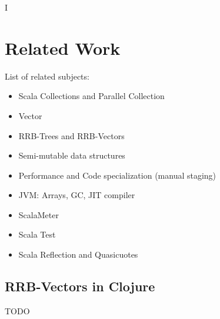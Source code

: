 I%

\chapter{Related Work} %

\label{RelatedWork} %



List of related subjects:
\begin{itemize}
  \item Scala Collections and Parallel Collection
  \item Vector
  \item RRB-Trees and RRB-Vectors
  \item Semi-mutable data structures
  \item Performance and Code specialization (manual staging)
  \item JVM: Arrays, GC, JIT compiler
  \item ScalaMeter
  \item Scala Test
  \item Scala Reflection and Quasicuotes
\end{itemize}

\section{RRB-Vectors in Clojure}



\color{red} TODO \color{black}

